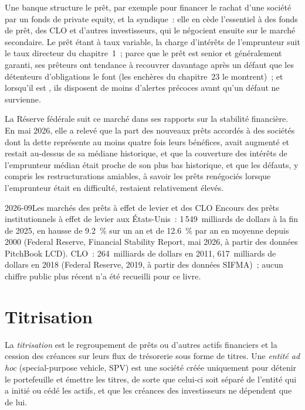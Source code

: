Une banque structure le prêt, par exemple pour financer le rachat d'une société par un fonds de
private equity, et la syndique~: elle en cède l'essentiel à des fonds de prêt, des CLO et d'autres
investisseurs, qui le négocient ensuite sur le marché secondaire. Le prêt étant à taux variable, la
charge d'intérêts de l'emprunteur suit le taux directeur du chapitre~1~; parce que le prêt est
senior et généralement garanti, ses prêteurs ont tendance à recouvrer davantage après un défaut que
les détenteurs d'obligations le font (les enchères du chapitre~23 le montrent)~; et lorsqu'il est , ils
disposent de moins d'alertes précoces avant qu'un défaut ne survienne.

La Réserve fédérale suit ce marché dans ses rapports sur la stabilité financière. En
mai 2026, elle a relevé que la part des nouveaux prêts accordés à des sociétés dont la dette représente au moins quatre fois
leurs bénéfices, avait augmenté et restait au-dessus de sa médiane historique, et que la
couverture des intérêts de l'emprunteur médian était proche de son plus bas historique, et que les défauts, y compris les
restructurations amiables, à savoir les prêts renégociés lorsque l'emprunteur était en difficulté, restaient relativement
élevés.

\begin{dated}{2026-09}{Les marchés des prêts à effet de levier et des CLO}\label{dat:m2:loans-clos-and-securitisation:size}
Encours des prêts institutionnels à effet de levier aux États-Unis~: 1\,549~milliards de dollars à la
fin de 2025, en hausse de 9.2~\% sur un an et de 12.6~\% par an en moyenne depuis 2000
(Federal Reserve, Financial Stability Report, mai 2026, à partir des données PitchBook LCD).
CLO~: 264~milliards de dollars en 2011, 617~milliards de dollars en 2018 (Federal Reserve, 2019, à partir des
données SIFMA)~; aucun chiffre public plus récent n'a été recueilli pour ce livre.
\end{dated}

\section{Titrisation}

\begin{definition}\label{def:m2:loans-clos-and-securitisation:sec}
La \emph{titrisation} est le regroupement de prêts ou d'autres
actifs financiers et la cession des créances sur leurs flux de trésorerie sous forme de titres. Une
\emph{entité ad hoc} (special-purpose vehicle, SPV) est une société créée
uniquement pour détenir le portefeuille et émettre les titres, de sorte que celui-ci soit séparé de
l'entité qui a initié ou cédé les actifs, et que les créances des investisseurs ne dépendent que de lui.
\end{definition}

